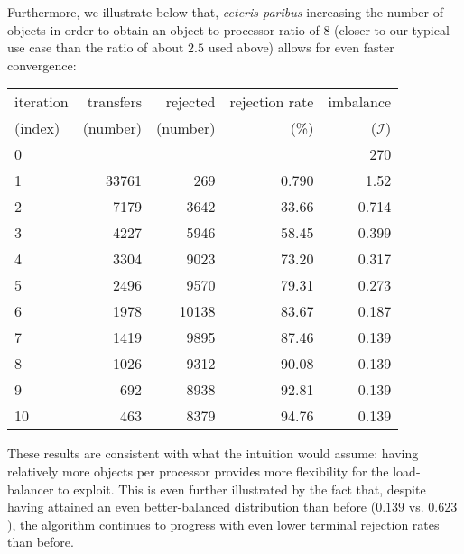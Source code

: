 Furthermore, we illustrate below that, \emph{ceteris paribus}
increasing the number of objects in order to obtain an
object-to-processor ratio of $8$ (closer to our typical use case
than the ratio of about $2.5$ used above) allows for even faster convergence:
\begin{center}
\begin{tabular}{@{}lrrrr@{}}
\hline
iteration & transfers & rejected & rejection rate & imbalance\\
(index)   & (number)  & (number) & (\%) & ($\mathcal{I}$)\\
\hline\hline
 0 &       &       &       &   270\\
 1 & 33761 &   269 & 0.790 &  1.52\\
 2 &  7179 &  3642 & 33.66 & 0.714\\
 3 &  4227 &  5946 & 58.45 & 0.399\\
 4 &  3304 &  9023 & 73.20 & 0.317\\
 5 &  2496 &  9570 & 79.31 & 0.273\\
 6 &  1978 & 10138 & 83.67 & 0.187\\
 7 &  1419 &  9895 & 87.46 & 0.139\\
 8 &  1026 &  9312 & 90.08 & 0.139\\
 9 &   692 &  8938 & 92.81 & 0.139\\
10 &   463 &  8379 & 94.76 & 0.139\\
\hline
\end{tabular}
\end{center}

These results are consistent with what the intuition would assume:
having relatively more objects per processor provides more flexibility
for the load-balancer to exploit. 
This is even further illustrated by the fact that, despite having
attained an even better-balanced distribution than before ($0.139$
vs. $0.623$), the algorithm continues to progress with even lower
terminal rejection rates than before.
